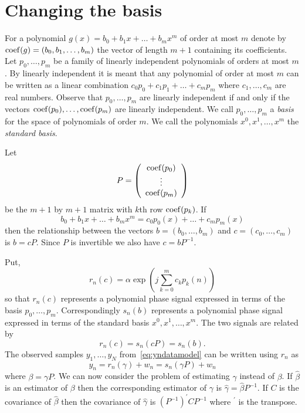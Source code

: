 \documentclass[journal,10pt]{IEEEtran}
\begin{document}
\section{Changing the basis}\label{sec:changing-basis}

\newcommand{\calP}{{\mathcal P}}

For a polynomial $g(x) = b_0 + b_1 x + \dots + b_m x^m$ of order at most $m$ denote by $\operatorname{coef}(g) = (b_0, b_1, \dots, b_m)$ the vector of length $m+1$ containing its coefficients.  Let $p_0,\dots, p_m$ be a family of linearly independent polynomials of orders at most $m$.  By linearly independent it is meant that any polynomial of order at most $m$ can be written as a linear combination $c_0p_0 + c_1 p_1 + \dots + c_m p_m$ where $c_1, \dots, c_m$ are real numbers.  Observe that $p_0, \dots, p_m$ are linearly independent if and only if the vectors $\operatorname{coef}(p_0), \dots, \operatorname{coef}(p_m)$ are linearly independent.  We call $p_0, \dots, p_m$ a \emph{basis} for the space of polynomials of order $m$.  We call the polynomials $x^0, x^1, \dots, x^m$ the \emph{standard basis}.  

Let 
\[
P = \left( \begin{array}{c}
\operatorname{coef}(p_0) \\
\vdots \\
\operatorname{coef}(p_m)
\end{array} \right)
\] 
be the $m+1$ by $m+1$ matrix with $k$th row $\operatorname{coef}(p_k)$.  If
\[
b_0 + b_1 x + \dots + b_m x^m = c_0 p_0(x) + \dots + c_m p_m(x)
\]
then the relationship between the vectors $b =  (b_0, \dots, b_m)$ and $c =  (c_0, \dots, c_m)$ is $b = cP$.  Since $P$ is invertible we also have $c = bP^{-1}$.

Put,
\[
r_n(c) = \alpha \exp\left( j \sum_{k = 0}^{m}{c_k p_k(n)}\right)
\]
so that $r_n(c)$ represents a polynomial phase signal expressed in terms of the basis $p_0, \dots, p_m$.  Correspondingly $s_n(b)$ represents a polynomial phase signal expressed in terms of the standard basis $x^0, x^1, \dots, x^m$.  The two signals are related by
\[
r_n(c) = s_n(cP) = s_n(b).
\]
The observed samples $y_1,\dots,y_N$ from~\eqref{eq:yndatamodel} can be written using $r_n$ as
\[
y_n = r_n(\gamma) + w_n = s_n(\gamma P) + w_n
\]
where $\beta = \gamma P$.  We can now consider the problem of estimating $\gamma$ instead of $\beta$.  If $\hat{\beta}$ is an estimator of $\beta$ then the corresponding estimator of $\gamma$ is $\hat{\gamma} = \hat{\beta}P^{-1}$.  If $C$ is the covariance of $\hat{\beta}$ then the covariance of $\hat{\gamma}$ is $(P^{-1})^\prime C P^{-1}$ where $^\prime$ is the transpose.
\end{document}
